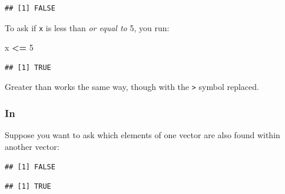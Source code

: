 \documentclass[]{book}
\newenvironment{Shaded}{\begin{snugshade}}{\end{snugshade}}
\newcommand{\KeywordTok}[1]{\textcolor[rgb]{0.13,0.29,0.53}{\textbf{#1}}}
\newcommand{\DecValTok}[1]{\textcolor[rgb]{0.00,0.00,0.81}{#1}}
\newcommand{\StringTok}[1]{\textcolor[rgb]{0.31,0.60,0.02}{#1}}
\newcommand{\CommentTok}[1]{\textcolor[rgb]{0.56,0.35,0.01}{\textit{#1}}}
\newcommand{\OperatorTok}[1]{\textcolor[rgb]{0.81,0.36,0.00}{\textbf{#1}}}
\newcommand{\NormalTok}[1]{#1}
\theoremstyle{definition}
\theoremstyle{definition}
\theoremstyle{definition}
\theoremstyle{remark}
\begin{document}
\begin{verbatim}
## [1] FALSE
\end{verbatim}

To ask if \texttt{x} is less than \emph{or equal to} 5, you run:

\begin{Shaded}
\begin{Highlighting}[]
\NormalTok{x }\OperatorTok{<=}\StringTok{ }\DecValTok{5}
\end{Highlighting}
\end{Shaded}

\begin{verbatim}
## [1] TRUE
\end{verbatim}

Greater than works the same way, though with the \texttt{\textgreater{}}
symbol replaced.

\subsubsection*{In}\label{in}

Suppose you want to ask which elements of one vector are also found
within another vector:

\begin{Shaded}
\end{Shaded}

\begin{verbatim}
## [1] FALSE
\end{verbatim}

\begin{Shaded}
\end{Shaded}

\begin{verbatim}
## [1] TRUE
\end{verbatim}

\begin{Shaded}
\end{Shaded}
\end{document}
